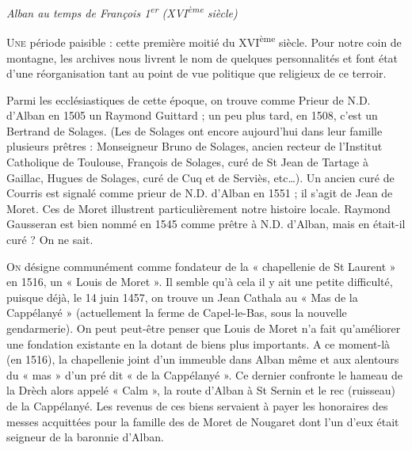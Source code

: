 
\begin{center}
  {\Large\itshape Alban au temps de François 1\textsuperscript{er} (XVI\textsuperscript{ème} siècle)}
\end{center}

\vspace{1em}

\lettrine{U}{ne} période paisible : cette première moitié du XVI\textsuperscript{ème} siècle. Pour notre coin de montagne, les archives nous livrent le nom de quelques personnalités et font état d’une réorganisation tant au point de vue politique que religieux de ce terroir.

\medskip

Parmi les ecclésiastiques de cette époque, on trouve comme Prieur de N.D. d’Alban en 1505 un Raymond Guittard ; un peu plus tard, en 1508, c’est un Bertrand de Solages. (Les de Solages ont encore aujourd’hui dans leur famille plusieurs prêtres : Monseigneur Bruno de Solages, ancien recteur de l’Institut Catholique de Toulouse, François de Solages, curé de St Jean de Tartage à Gaillac, Hugues de Solages, curé de Cuq et de Serviès, etc…). Un ancien curé de Courris est signalé comme prieur de N.D. d’Alban en 1551 ; il s’agit de Jean de Moret. Ces de Moret illustrent particulièrement notre histoire locale. Raymond Gausseran est bien nommé en 1545 comme prêtre à N.D. d’Alban, mais en était-il curé ? On ne sait.

\medskip

\lettrine{O}{n} désigne communément comme fondateur de la « chapellenie de St Laurent » en 1516, un « Louis de Moret ». Il semble qu’à cela il y ait une petite difficulté, puisque déjà, le 14 juin 1457, on trouve un Jean Cathala au « Mas de la Cappélanyé » (actuellement la ferme de Capel-le-Bas, sous la nouvelle gendarmerie). On peut peut-être penser que Louis de Moret n’a fait qu’améliorer une fondation existante en la dotant de biens plus importants. A ce moment-là (en 1516), la chapellenie joint d’un immeuble dans Alban même et aux alentours du « mas » d’un pré dit « de la Cappélanyé ». Ce dernier confronte le hameau de la Drèch alors appelé « Calm », la route d’Alban à St Sernin et le rec (ruisseau) de la Cappélanyé. Les revenus de ces biens servaient à payer les honoraires des messes acquittées pour la famille des de Moret de Nougaret dont l’un d’eux était seigneur de la baronnie d’Alban.
